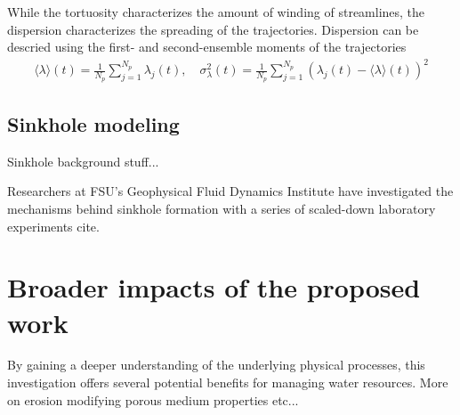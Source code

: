 \documentclass[12pt]{article}
\newcommand{\nick}[1]{{\color{red}#1}}
\newcommand{\np}{\newpage \noindent}
\begin{document}
While the tortuosity characterizes the amount of winding of streamlines,
the dispersion characterizes the spreading of the trajectories.
Dispersion can be descried using the first- and second-ensemble moments
of the trajectories
\begin{align}
  \langle \lambda \rangle (t) = \frac{1}{N_p} \sum_{j=1}^{N_p}
    \lambda_j(t), \quad \sigma_\lambda^{2}(t) = \frac{1}{N_p}
    \sum_{j=1}^{N_p} (\lambda_j(t) - \langle \lambda \rangle(t))^2
\end{align}


\subsection{Sinkhole modeling}

Sinkhole background stuff...

Researchers at FSU's Geophysical Fluid Dynamics Institute have investigated the mechanisms behind sinkhole formation with a series of scaled-down laboratory experiments {\color{blue} cite}.





\np



\section{Broader impacts of the proposed work}

By gaining a deeper understanding of the underlying physical processes, this investigation offers several potential benefits for managing water resources.
\nick{More on erosion modifying porous medium properties etc...}
\end{document}

